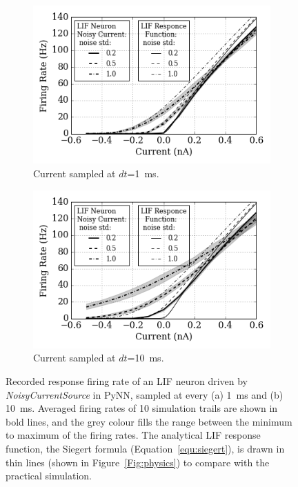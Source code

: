 	\begin{figure}[tbp!]
		\centering
		\begin{subfigure}[t]{0.49\textwidth}
			\includegraphics[width=\textwidth]{pics_iconip/2-1.png}
			\caption{Current sampled at $dt$=1~ms.}
		\end{subfigure}
		\begin{subfigure}[t]{0.49\textwidth}
			\includegraphics[width=\textwidth]{pics_iconip/2-10.png}
			\caption{Current sampled at $dt$=10~ms.}
		\end{subfigure}
		\caption[Recorded response firing rate driven by \textit{NoisyCurrentSource}.]{Recorded response firing rate of an LIF neuron driven by \textit{NoisyCurrentSource} in PyNN, sampled at every (a) 1~ms and (b) 10~ms. Averaged firing rates of 10 simulation trails are shown in bold lines, and the grey colour fills the range between the minimum to maximum of the firing rates. The analytical LIF response function, the Siegert formula (Equation~\ref{equ:siegert}), is drawn in thin lines (shown in Figure~\ref{Fig:physics}) to compare with the practical simulation.}
		\label{Fig:current}
	\end{figure}
	

